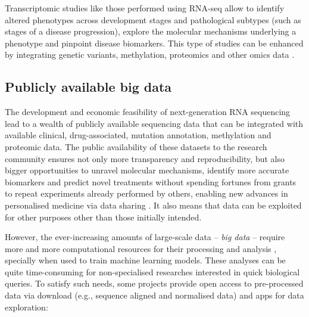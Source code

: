 
Transcriptomic studies like those performed using RNA-seq allow to identify altered phenotypes across development stages and pathological subtypes (such as stages of a disease progression), explore the molecular mechanisms underlying a phenotype and pinpoint disease biomarkers. This type of studies can be enhanced by integrating genetic variants, methylation, proteomics and other omics data \cite{chang:2013ww,conesa:2016vw,perez-riverol:2019uk}.

\subsection{Publicly available big data}

The development and economic feasibility of next-generation RNA sequencing lead to a wealth of publicly available sequencing data that can be integrated with available clinical, drug-associated, mutation annotation, methylation and proteomic data. The public availability of these datasets to the research community ensures not only more transparency and reproducibility, but also bigger opportunities to unravel molecular mechanisms, identify more accurate biomarkers and predict novel treatments without spending fortunes from grants to repeat experiments already performed by others, enabling new advances in personalised medicine via data sharing \cite{rockhold:2019ws}. It also means that data can be exploited for other purposes other than those initially intended.

However, the ever-increasing amounts of large-scale data -- \emph{big data} -- require more and more computational resources for their processing and analysis \cite{gauthier:2018ws}, specially when used to train machine learning models. These analyses can be quite time-consuming for non-specialised researches interested in quick biological queries. To satisfy such needs, some projects provide open access to pre-processed data via download (e.g., sequence aligned and normalised data) and apps for data exploration:

